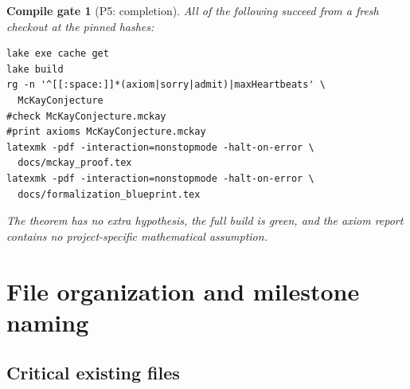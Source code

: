 \documentclass[11pt]{article}
\newtheorem{gate}{Compile gate}
\begin{document}
\begin{gate}[P5: completion]
All of the following succeed from a fresh checkout at the pinned hashes:
\begin{lstlisting}
lake exe cache get
lake build
rg -n '^[[:space:]]*(axiom|sorry|admit)|maxHeartbeats' \
  McKayConjecture
#check McKayConjecture.mckay
#print axioms McKayConjecture.mckay
latexmk -pdf -interaction=nonstopmode -halt-on-error \
  docs/mckay_proof.tex
latexmk -pdf -interaction=nonstopmode -halt-on-error \
  docs/formalization_blueprint.tex
\end{lstlisting}
The theorem has no extra hypothesis, the full build is green, and the
axiom report contains no project-specific mathematical assumption.
\end{gate}

\section{File organization and milestone naming}

\subsection{Critical existing files}
\end{document}
